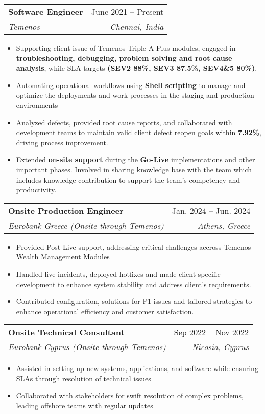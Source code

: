 \documentclass[letterpaper,11pt]{article}
\makeatletter
\newcommand{\resumeItem}[1]{
  \item\small{
    {#1 \vspace{-2pt}}
  }
}
\newcommand{\resumeSubheading}[4]{
  \vspace{-2pt}\item
    \begin{tabular*}{0.97\textwidth}[t]{l@{\extracolsep{\fill}}r}
      \textbf{#1} & #2 \\
      \textit{\small#3} & \textit{\small #4} \\
    \end{tabular*}\vspace{-7pt}
}
\newcommand{\resumeSubSubheading}[2]{
    \item
    \begin{tabular*}{0.97\textwidth}{l@{\extracolsep{\fill}}r}
      \textit{\small#1} & \textit{\small #2} \\
    \end{tabular*}\vspace{-7pt}
}
\newcommand{\resumeSubHeadingListEnd}{\end{itemize}}
\newcommand{\resumeItemListStart}{\begin{itemize}}
\newcommand{\resumeItemListEnd}{\end{itemize}\vspace{-5pt}}
\makeatother
\begin{document}
    \resumeSubheading
      {Software Engineer}{June 2021 -- Present}
      {Temenos}{Chennai, India}
      \resumeItemListStart
        \resumeItem{Supporting client issue of Temenos Triple A Plus modules, engaged in \textbf{troubleshooting, debugging, problem solving and root cause analysis}, while SLA targets \textbf{(SEV2 88\%, SEV3 87.5\%, SEV4\&5 80\%)}.   }
        \resumeItem{Automating operational workflows using \textbf{Shell scripting} to manage and optimize the deployments and work processes in the staging and production environments }
        \resumeItem{Analyzed defects, provided root cause reports, and collaborated with development teams to maintain valid client defect reopen goals within \textbf{7.92\%}, driving process improvement.}
        \resumeItem{Extended \textbf{on-site support} during the \textbf{Go-Live} implementations and other important phases. Involved in sharing knowledge base with the team which includes knowledge contribution to support the team’s competency and productivity.}
      \resumeItemListEnd
      

    \resumeSubheading
      {Onsite Production Engineer}{Jan. 2024 -- Jun. 2024}
      {Eurobank Greece (Onsite through Temenos)}{Athens, Greece}
      \resumeItemListStart
        \resumeItem{ Provided Post-Live support, addressing critical challenges accross Temenos Wealth Management Modules}
        \resumeItem{Handled live incidents, deployed hotfixes and made client specific development to enhance system stability and address client’s requirements.}
        \resumeItem{Contributed configuration, solutions for P1 issues and tailored strategies to enhance operational efficiency and customer satisfaction.}
    \resumeItemListEnd

    \resumeSubheading
      {Onsite Technical Consultant}{Sep 2022 -- Nov 2022}
      {Eurobank Cyprus (Onsite through Temenos)}{Nicosia, Cyprus}
      \resumeItemListStart
        \resumeItem{Assisted in setting up new systems, applications, and software while ensuring SLAs through resolution of technical issues}
        \resumeItem{Collaborated with stakeholders for swift resolution of complex problems, leading offshore teams with regular updates}
      \resumeItemListEnd
\end{document}
